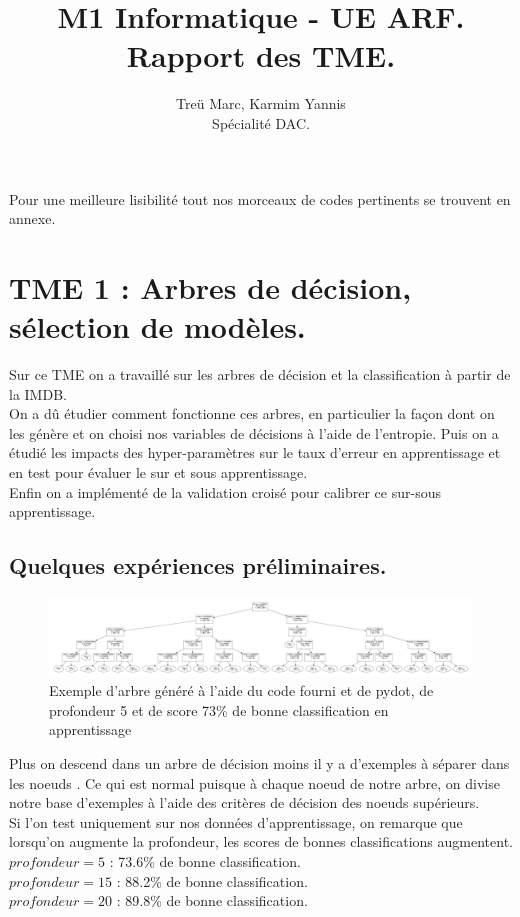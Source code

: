 \documentclass{article}
\title{M1 Informatique - UE ARF.\\Rapport des TME.}
\author{Treü Marc, Karmim Yannis\\Spécialité DAC.}
\begin{document}
\maketitle
\clearpage
\tableofcontents
\clearpage
Pour une meilleure lisibilité tout nos morceaux de codes pertinents se trouvent en annexe. 
\section{TME 1 : Arbres de décision, sélection de modèles.}
Sur ce TME on a travaillé sur les arbres de décision et la classification à partir de la IMDB.\\
On a dû étudier comment fonctionne ces arbres, en particulier la façon dont on les génère et on choisi nos variables de décisions à l'aide de l'entropie. Puis on a étudié les impacts des hyper-paramètres sur le taux d'erreur en apprentissage et en test pour évaluer le sur et sous apprentissage. \\
Enfin on a implémenté de la validation croisé pour calibrer ce sur-sous apprentissage.\\

\subsection{Quelques expériences préliminaires.}

\begin{figure}[h]
	\center
	\includegraphics[width=16cm]{../tme1/test_tree.png} 
	 \caption{Exemple d'arbre généré à l'aide du code fourni et de pydot, de profondeur 5 et de score 73\% de bonne classification en apprentissage }
	 
\end{figure}
Plus on descend dans un arbre de décision moins il y a d'exemples à séparer dans les noeuds . Ce qui est normal puisque à chaque noeud de notre arbre, on divise notre base d'exemples à l'aide des critères de décision des noeuds supérieurs.\\
Si l'on test uniquement sur nos données d'apprentissage, on remarque que lorsqu'on augmente la profondeur, les scores de bonnes classifications augmentent.\\
$profondeur = 5$ : 73.6\% de bonne classification.\\
$profondeur = 15$ : 88.2\% de bonne classification.\\
$profondeur = 20$ : 89.8\% de bonne classification.\\
\end{document}
